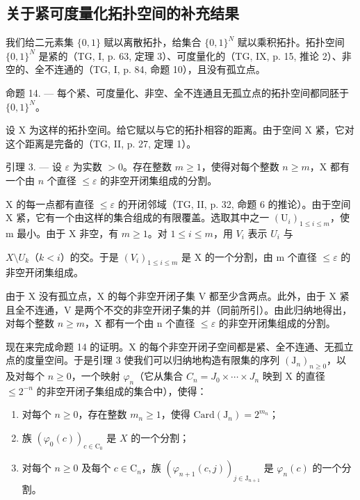 \subsection{关于紧可度量化拓扑空间的补充结果}

我们给二元素集 \(\{0,1\}\) 赋以离散拓扑，给集合 \(\{0,1\}^{N}\) 赋以乘积拓扑。拓扑空间 \(\{0,1\}^{N}\) 是紧的（TG, I, p. 63, 定理 3）、可度量化的（TG, IX, p. 15, 推论 2）、非空的、全不连通的（TG, I, p. 84, 命题 10），且没有孤立点。

命题 14. --- 每个紧、可度量化、非空、全不连通且无孤立点的拓扑空间都同胚于 \(\{0,1\}^{N}\)。

设 X 为这样的拓扑空间。给它赋以与它的拓扑相容的距离。由于空间 X 紧，它对这个距离是完备的（TG, II, p. 27, 定理 1）。

引理 3. --- 设 \(\varepsilon\) 为实数 \(>0\)。存在整数 \(m \geqslant 1\)，使得对每个整数 \(n \geqslant m\)，X 都有一个由 \(n\) 个直径 \(\leqslant \varepsilon\) 的非空开闭集组成的分割。

X 的每一点都有直径 \(\leqslant\varepsilon\) 的开闭邻域（TG, II, p. 32, 命题 6 的推论）。由于空间 X 紧，它有一个由这样的集合组成的有限覆盖。选取其中之一 \((\mathrm{U}_{i})_{1\leqslant i\leqslant m}\)，使 m 最小。由于 X 非空，有 \(m\geqslant1\)。对 \(1\leqslant i\leqslant m\)，用 \(V_{i}\) 表示 \(U_{i}\) 与

\(X\setminus U_k\)（\(k < i\)）的交。于是 \((V_i)_{1 \leqslant i \leqslant m}\) 是 X 的一个分割，由 m 个直径 \(\leqslant \varepsilon\) 的非空开闭集组成。

由于 X 没有孤立点，X 的每个非空开闭子集 V 都至少含两点。此外，由于 X 紧且全不连通，V 是两个不交的非空开闭子集的并（同前所引）。由此归纳地得出，对每个整数 \(n \geqslant m\)，X 都有一个由 n 个直径 \(\leqslant \varepsilon\) 的非空开闭集组成的分割。

现在来完成命题 14 的证明。X 的每个非空开闭子空间都是紧、全不连通、无孤立点的度量空间。于是引理 3 使我们可以归纳地构造有限集的序列 \((\mathrm{J}_{n})_{n\geqslant0}\)，以及对每个 \(n\geqslant0\)，一个映射 \(\varphi_{n}\)（它从集合 \(C_{n}=J_{0}\times\cdots\times J_{n}\) 映到 X 的直径 \(\leqslant2^{-n}\) 的非空开闭子集组成的集合中），使得：

\begin{enumerate}
\def\labelenumi{(\roman{enumi})}
\item
  对每个 \(n \geqslant 0\)，存在整数 \(m_n \geqslant 1\)，使得 \(\mathrm{Card}(\mathrm{J}_n) = 2^{m_n}\)；
\item
  族 \((\varphi_0(c))_{c\in \mathrm{C}_0}\) 是 \(X\) 的一个分割；
\item
  对每个 \(n \geqslant 0\) 及每个 \(c \in \mathrm{C}_n\)，族 \((\varphi_{n+1}(c,j))_{j \in \mathrm{J}_{n+1}}\) 是 \(\varphi_n(c)\) 的一个分割。
\end{enumerate}

